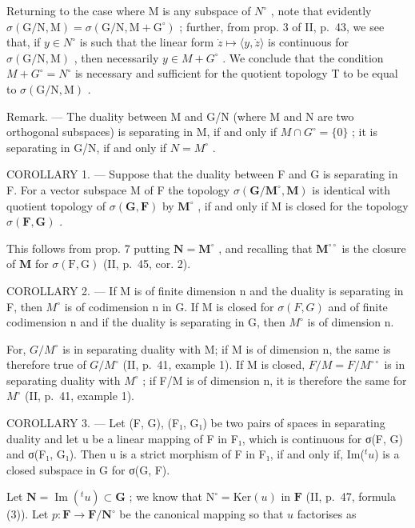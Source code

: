 Returning to the case where M is any subspace of \(N^{\circ}\) , note that evidently \(\sigma(\mathrm{G}/\mathrm{N},\mathrm{M})=\sigma(\mathrm{G}/\mathrm{N},\mathrm{M}+\mathrm{G}^{\circ})\) ; further, from prop. 3 of II, p.~43, we see that, if \(y\in N^{\circ}\) is such that the linear form \(\dot{z}\mapsto\langle y,\dot{z}\rangle\) is continuous for \(\sigma(\mathrm{G}/\mathrm{N},\mathrm{M})\) , then necessarily \(y\in M+G^{\circ}\) . We conclude that the condition \(M+G^{\circ}=N^{\circ}\) is necessary and sufficient for the quotient topology T to be equal to \(\sigma(\mathrm{G}/\mathrm{N},\mathrm{M})\) .

Remark. --- The duality between M and G/N (where M and N are two orthogonal subspaces) is separating in M, if and only if \(M \cap G^{\circ} = \{0\}\) ; it is separating in G/N, if and only if \(N = M^{\circ}\) .

COROLLARY 1. --- Suppose that the duality between F and G is separating in F. For a vector subspace M of F the topology \(\sigma(\mathbf{G}/\mathbf{M}^{\circ}, \mathbf{M})\) is identical with quotient topology of \(\sigma(\mathbf{G}, \mathbf{F})\) by \(\mathbf{M}^{\circ}\) , if and only if M is closed for the topology \(\sigma(\mathbf{F}, \mathbf{G})\) .

This follows from prop. 7 putting \(\mathbf{N} = \mathbf{M}^{\circ}\) , and recalling that \(\mathbf{M}^{\circ \circ}\) is the closure of \(\mathbf{M}\) for \(\sigma (\mathrm{F},\mathrm{G})\) (II, p.~45, cor. 2).

COROLLARY 2. --- If M is of finite dimension n and the duality is separating in F, then \(M^{\circ}\) is of codimension n in G. If M is closed for \(\sigma(F, G)\) and of finite codimension n and if the duality is separating in G, then \(M^{\circ}\) is of dimension n.

For, \(G/M^{\circ}\) is in separating duality with M; if M is of dimension n, the same is therefore true of \(G/M^{\circ}\) (II, p.~41, example 1). If M is closed, \(F/M = F/M^{\circ\circ}\) is in separating duality with \(M^{\circ}\) ; if F/M is of dimension n, it is therefore the same for \(M^{\circ}\) (II, p.~41, example 1).

COROLLARY 3. --- Let (F, G), (F₁, G₁) be two pairs of spaces in separating duality and let u be a linear mapping of F in F₁, which is continuous for σ(F, G) and σ(F₁, G₁). Then u is a strict morphism of F in F₁, if and only if, Im(\({}^t u\)) is a closed subspace in G for σ(G, F).

Let \(\mathbf{N} = \operatorname{Im}(^t u) \subset \mathbf{G}\) ; we know that \(\mathrm{N}^{\circ} = \mathrm{Ker}(u)\) in \(\mathbf{F}\) (II, p.~47, formula (3)). Let \(p: \mathbf{F} \to \mathbf{F}/\mathbf{N}^{\circ}\) be the canonical mapping so that \(u\) factorises as

